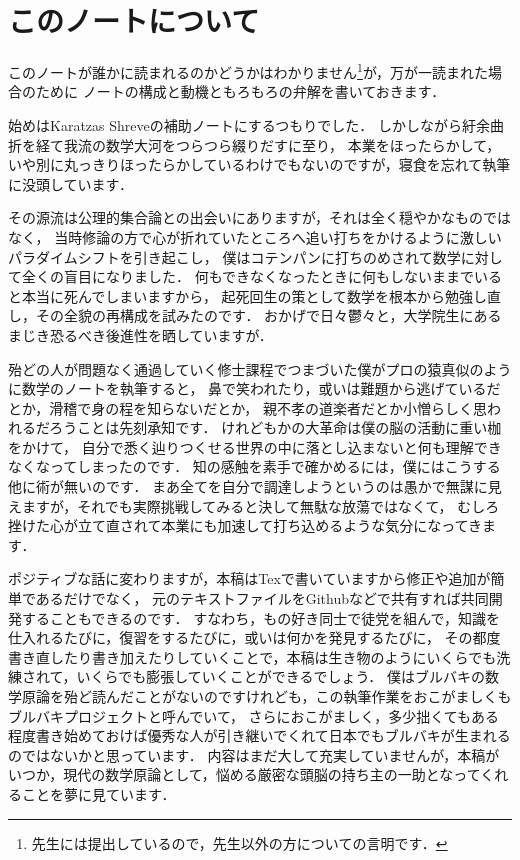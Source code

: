 \chapter*{このノートについて}

このノートが誰かに読まれるのかどうかはわかりません\footnote{先生には提出しているので，先生以外の方についての言明です．}が，万が一読まれた場合のために
ノートの構成と動機ともろもろの弁解を書いておきます．

始めはKaratzas Shreveの補助ノートにするつもりでした．
しかしながら紆余曲折を経て我流の数学大河をつらつら綴りだすに至り，
本業をほったらかして，いや別に丸っきりほったらかしているわけでもないのですが，寝食を忘れて執筆に没頭しています．

その源流は公理的集合論との出会いにありますが，それは全く穏やかなものではなく，
当時修論の方で心が折れていたところへ追い打ちをかけるように激しいパラダイムシフトを引き起こし，
僕はコテンパンに打ちのめされて数学に対して全くの盲目になりました．
何もできなくなったときに何もしないままでいると本当に死んでしまいますから，
起死回生の策として数学を根本から勉強し直し，その全貌の再構成を試みたのです．
おかげで日々鬱々と，大学院生にあるまじき恐るべき後進性を晒していますが．

殆どの人が問題なく通過していく修士課程でつまづいた僕がプロの猿真似のように数学のノートを執筆すると，
鼻で笑われたり，或いは難題から逃げているだとか，滑稽で身の程を知らないだとか，
親不孝の道楽者だとか小憎らしく思われるだろうことは先刻承知です．
けれどもかの大革命は僕の脳の活動に重い枷をかけて，
自分で悉く辿りつくせる世界の中に落とし込まないと何も理解できなくなってしまったのです．
知の感触を素手で確かめるには，僕にはこうする他に術が無いのです．
まあ全てを自分で調達しようというのは愚かで無謀に見えますが，それでも実際挑戦してみると決して無駄な放蕩ではなくて，
むしろ挫けた心が立て直されて本業にも加速して打ち込めるような気分になってきます．

ポジティブな話に変わりますが，本稿はTexで書いていますから修正や追加が簡単であるだけでなく，
元のテキストファイルをGithubなどで共有すれば共同開発することもできるのです．
すなわち，もの好き同士で徒党を組んで，知識を仕入れるたびに，復習をするたびに，或いは何かを発見するたびに，
その都度書き直したり書き加えたりしていくことで，本稿は生き物のようにいくらでも洗練されて，いくらでも膨張していくことができるでしょう．
僕はブルバキの数学原論を殆ど読んだことがないのですけれども，この執筆作業をおこがましくもブルバキプロジェクトと呼んでいて，
さらにおこがましく，多少拙くてもある程度書き始めておけば優秀な人が引き継いでくれて日本でもブルバキが生まれるのではないかと思っています．
内容はまだ大して充実していませんが，本稿がいつか，現代の数学原論として，悩める厳密な頭脳の持ち主の一助となってくれることを夢に見ています．

